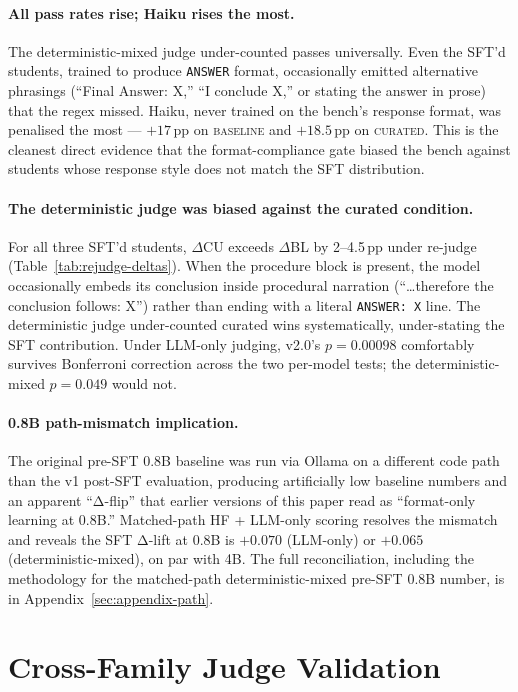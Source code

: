 \documentclass[10pt]{article}
\newcommand{\BL}{\textsc{baseline}\xspace}
\newcommand{\CU}{\textsc{curated}\xspace}
\begin{document}
\paragraph{All pass rates rise; Haiku rises the most.} The deterministic-mixed judge under-counted passes universally. Even the SFT'd students, trained to produce \texttt{ANSWER} format, occasionally emitted alternative phrasings (``Final Answer: X,'' ``I conclude X,'' or stating the answer in prose) that the regex missed. Haiku, never trained on the bench's response format, was penalised the most --- $+17$\,pp on \BL{} and $+18.5$\,pp on \CU{}. This is the cleanest direct evidence that the format-compliance gate biased the bench against students whose response style does not match the SFT distribution.

\paragraph{The deterministic judge was biased against the curated condition.} For all three SFT'd students, $\Delta$CU exceeds $\Delta$BL by 2--4.5\,pp under re-judge (Table~\ref{tab:rejudge-deltas}). When the procedure block is present, the model occasionally embeds its conclusion inside procedural narration (``\dots therefore the conclusion follows: X'') rather than ending with a literal \texttt{ANSWER: X} line. The deterministic judge under-counted curated wins systematically, under-stating the SFT contribution. Under LLM-only judging, v2.0's $p{=}0.00098$ comfortably survives Bonferroni correction across the two per-model tests; the deterministic-mixed $p{=}0.049$ would not.

\paragraph{0.8B path-mismatch implication.} The original pre-SFT 0.8B baseline was run via Ollama on a different code path than the v1 post-SFT evaluation, producing artificially low baseline numbers and an apparent ``Δ-flip'' that earlier versions of this paper read as ``format-only learning at 0.8B.'' Matched-path HF + LLM-only scoring resolves the mismatch and reveals the SFT Δ-lift at 0.8B is $+0.070$ (LLM-only) or $+0.065$ (deterministic-mixed), on par with 4B. The full reconciliation, including the methodology for the matched-path deterministic-mixed pre-SFT 0.8B number, is in Appendix~\ref{sec:appendix-path}.

\section{Cross-Family Judge Validation}\label{sec:cross-family}
\end{document}
